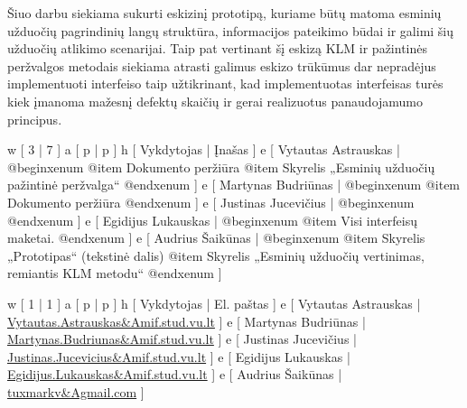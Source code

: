 
Šiuo darbu siekiama sukurti eskizinį prototipą, kuriame būtų matoma esminių
užduočių pagrindinių langų struktūra, informacijos pateikimo būdai ir galimi
šių užduočių atlikimo scenarijai. Taip pat vertinant šį eskizą KLM ir pažintinės
peržvalgos metodais siekiama atrasti galimus eskizo trūkūmus dar nepradėjus
implementuoti interfeiso taip užtikrinant, kad implementuotas interfeisas
turės kiek įmanoma mažesnį defektų skaičių ir gerai realizuotus panaudojamumo
principus.

\xtable
{
  w [ 3  | 7 ]
  a [ p  | p ]
  h [ Vykdytojas | Įnašas ]
  e [ Vytautas Astrauskas
  | @begin{xenum} 
      @item Dokumento peržiūra
      @item Skyrelis „Esminių užduočių pažintinė peržvalga“
    @end{xenum}
  ]
  e [ Martynas Budriūnas
  | @begin{xenum} 
      @item Dokumento peržiūra
    @end{xenum}
  ]
  e [ Justinas Jucevičius 
  | @begin{xenum} 
    @end{xenum}
  ]
  e [ Egidijus Lukauskas 
  | @begin{xenum} 
      @item Visi interfeisų maketai.
    @end{xenum}
  ]
  e [ Audrius Šaikūnas 
  | @begin{xenum} 
      @item Skyrelis „Prototipas“ (tekstinė dalis)
      @item Skyrelis „Esminių užduočių vertinimas, remiantis KLM metodu“
    @end{xenum}
  ]
}

\xtableu
{
  w [ 1 | 1 ]
  a [ p | p ]
  h [ Vykdytojas | El. paštas ]
  e [ Vytautas Astrauskas | \url{Vytautas.Astrauskas&Amif.stud.vu.lt} ]
  e [ Martynas Budriūnas  | \url{Martynas.Budriunas&Amif.stud.vu.lt} ]
  e [ Justinas Jucevičius | \url{Justinas.Jucevicius&Amif.stud.vu.lt} ]
  e [ Egidijus Lukauskas  | \url{Egidijus.Lukauskas&Amif.stud.vu.lt} ]
  e [ Audrius Šaikūnas    | \url{tuxmarkv&Agmail.com} ]
}
